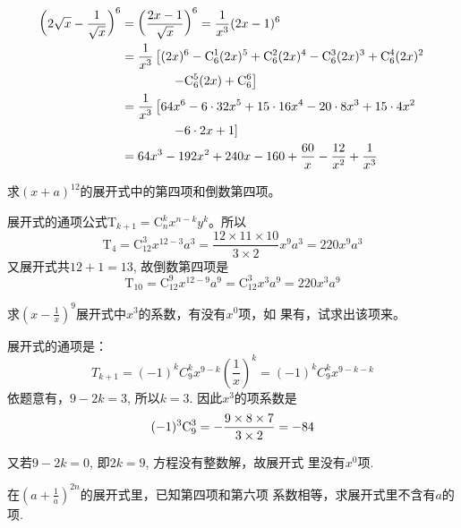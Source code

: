 \begin{solution}
\[\begin{split}
    \left(2\sqrt{x}-\frac{1}{\sqrt{x}}\right)^6&=\left(\frac{2x-1}{\sqrt{x}}\right)^6 =\frac{1}{x^3}(2x-1)^6\\
&=\frac{1}{x^3}\left[(2x)^6-\comb{1}{6}(2x)^5+\comb{2}{6}(2x)^4-\comb{3}{6}(2x)^3+\comb{4}{6}(2x)^2\right.\\
&\qquad \qquad \left.-\comb{5}{6}(2x)+\comb{6}{6}\right]\\
&=\frac{1}{x^3}\left[64x^6-6\cdot 32x^5+15\cdot 16x^4-20\cdot 8 x^3+15\cdot 4x^2\right.\\
&\qquad \qquad \left.-6\cdot 2x+1\right]\\
&=64x^3-192x^2+240x-160+\frac{60}{x}-\frac{12}{x^2}+\frac{1}{x^3}
\end{split}\]
\end{solution}

\begin{example}
    求$(x+a)^{12}$的展开式中的第四项和倒数第四项。
\end{example}

\begin{solution}
    展开式的通项公式$\mathrm{T}_{k+1}=\mathrm{C}_n^k x^{n-k}y^k$。所以
$$\mathrm{T}_{4}=\mathrm{C}_{12}^{3} x^{12-3} a^{3}=\frac{12\times11\times 10}{3\times2}x^{9} a^{3}=220x^{9} a^{3}$$
又展开式共$12+1=13$, 故倒数第四项是
$$\mathrm{T}_{10}=\mathrm{C}_{12}^{9} x^{12-9} a^{9}=\mathrm{C}_{12}^{3}x^{3} a^{9}=220x^{3} a^{9}$$
\end{solution}

\begin{example}
  求$(x-\frac{1}{x})^{9}$展开式中$x^3$的系数，有没有$x^{0}$项，如
果有，试求出该项来。  
\end{example}

\begin{solution}
    展开式的通项是：
$$T_{k+1} = ( -1 )^{k} C_{9}^{k} x^{9-k} (\frac{1}{x})^{k}=( -1)^{k} C_{9}^{k} x^{9-k-k}$$
依题意有，$9-2k=3$, 所以$k=3$. 因此$x^3$的项系数是
$$( -1 )^{3}{\rm C}_{9}^{3}=- \frac{9\times8\times7}{3\times2}=- 84$$

又若$9-2k=0$, 即$2k=9$, 方程没有整数解，故展开式
里没有$x^0$项.
\end{solution}

\begin{example}
   在$\left(a+\frac1a\right)^{2n}$的展开式里，已知第四项和第六项
系数相等，求展开式里不含有$a$的项. 
\end{example}

